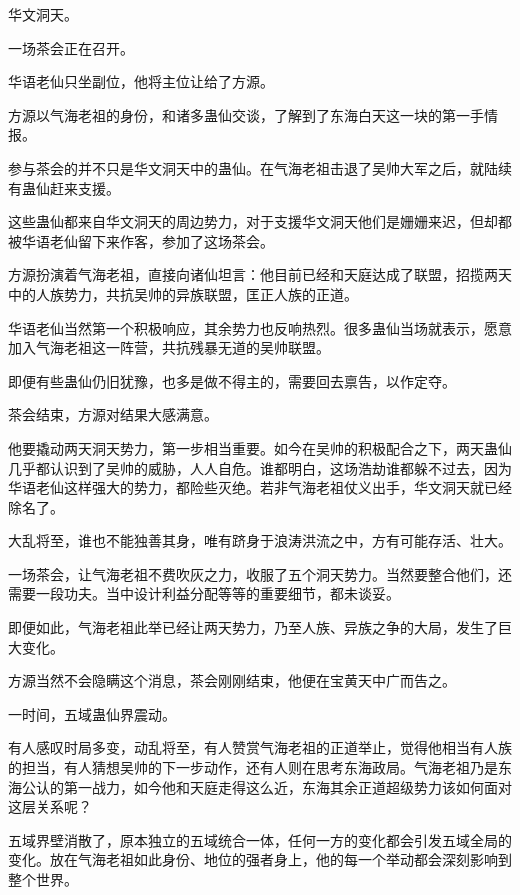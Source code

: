 
\begin{this_body}



华文洞天。

一场茶会正在召开。

华语老仙只坐副位，他将主位让给了方源。

方源以气海老祖的身份，和诸多蛊仙交谈，了解到了东海白天这一块的第一手情报。

参与茶会的并不只是华文洞天中的蛊仙。在气海老祖击退了吴帅大军之后，就陆续有蛊仙赶来支援。

这些蛊仙都来自华文洞天的周边势力，对于支援华文洞天他们是姗姗来迟，但却都被华语老仙留下来作客，参加了这场茶会。

方源扮演着气海老祖，直接向诸仙坦言：他目前已经和天庭达成了联盟，招揽两天中的人族势力，共抗吴帅的异族联盟，匡正人族的正道。

华语老仙当然第一个积极响应，其余势力也反响热烈。很多蛊仙当场就表示，愿意加入气海老祖这一阵营，共抗残暴无道的吴帅联盟。

即便有些蛊仙仍旧犹豫，也多是做不得主的，需要回去禀告，以作定夺。

茶会结束，方源对结果大感满意。

他要撬动两天洞天势力，第一步相当重要。如今在吴帅的积极配合之下，两天蛊仙几乎都认识到了吴帅的威胁，人人自危。谁都明白，这场浩劫谁都躲不过去，因为华语老仙这样强大的势力，都险些灭绝。若非气海老祖仗义出手，华文洞天就已经除名了。

大乱将至，谁也不能独善其身，唯有跻身于浪涛洪流之中，方有可能存活、壮大。

一场茶会，让气海老祖不费吹灰之力，收服了五个洞天势力。当然要整合他们，还需要一段功夫。当中设计利益分配等等的重要细节，都未谈妥。

即便如此，气海老祖此举已经让两天势力，乃至人族、异族之争的大局，发生了巨大变化。

方源当然不会隐瞒这个消息，茶会刚刚结束，他便在宝黄天中广而告之。

一时间，五域蛊仙界震动。

有人感叹时局多变，动乱将至，有人赞赏气海老祖的正道举止，觉得他相当有人族的担当，有人猜想吴帅的下一步动作，还有人则在思考东海政局。气海老祖乃是东海公认的第一战力，如今他和天庭走得这么近，东海其余正道超级势力该如何面对这层关系呢？

五域界壁消散了，原本独立的五域统合一体，任何一方的变化都会引发五域全局的变化。放在气海老祖如此身份、地位的强者身上，他的每一个举动都会深刻影响到整个世界。


\end{this_body}
